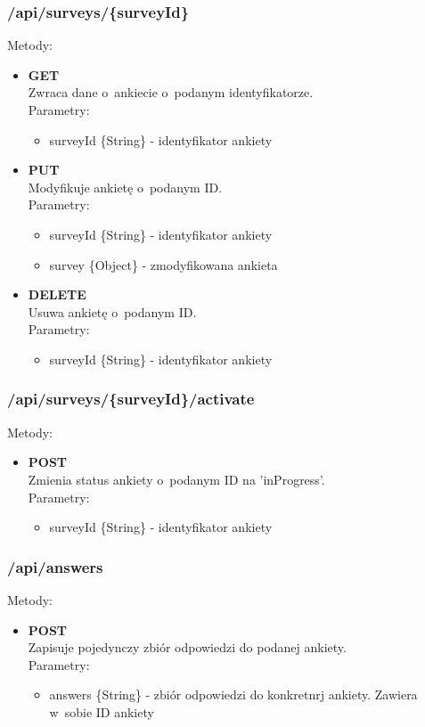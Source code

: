 \documentclass[8pt,a4paper,notitlepage]{article}
\begin{document}
\subsubsection{/api/surveys/\{surveyId\}}
Metody:
\begin{itemize}
\item \textbf{GET} \\ Zwraca dane o~ankiecie o~podanym identyfikatorze. \\ Parametry:
	\begin{itemize}
	\item surveyId \{String\} - identyfikator ankiety
	\end{itemize}
\item \textbf{PUT} \\ Modyfikuje ankietę o~podanym ID. \\ Parametry:
	\begin{itemize}
	\item surveyId \{String\} - identyfikator ankiety
	\item survey \{Object\} - zmodyfikowana ankieta
	\end{itemize}

\item \textbf{DELETE} \\ Usuwa ankietę o~podanym ID. \\ Parametry:
	\begin{itemize}
	\item surveyId \{String\} - identyfikator ankiety
	\end{itemize}
\end{itemize}

\subsubsection{/api/surveys/\{surveyId\}/activate}
Metody:
\begin{itemize}
\item \textbf{POST} \\ Zmienia status ankiety o~podanym ID na 'inProgress'. \\ Parametry:
	\begin{itemize}
	\item surveyId \{String\} - identyfikator ankiety
	\end{itemize}

\end{itemize}

\subsubsection{/api/answers}
Metody:
\begin{itemize}
\item \textbf{POST} \\ Zapisuje pojedynczy zbiór odpowiedzi do podanej ankiety. \\ Parametry:
	\begin{itemize}
	\item answers \{String\} - zbiór odpowiedzi do konkretnrj ankiety. Zawiera w~sobie ID ankiety
	\end{itemize}

\end{itemize}
\newpage
\end{document}
